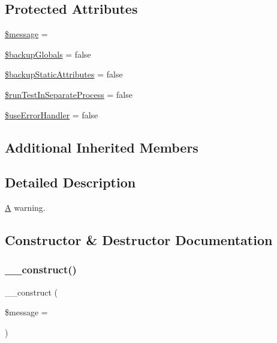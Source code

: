 \subsection*{Protected Attributes}
\begin{DoxyCompactItemize}
\item 
\mbox{\hyperlink{class_p_h_p_unit___framework___warning_test_case_abf17cb2dba2ed17cb28aa5f37deb5293}{\$message}} = \textquotesingle{}\textquotesingle{}
\item 
\mbox{\hyperlink{class_p_h_p_unit___framework___warning_test_case_a7c6af4e36636a61ec139a77a1c07cffe}{\$backup\+Globals}} = false
\item 
\mbox{\hyperlink{class_p_h_p_unit___framework___warning_test_case_a563497416305ba3d1caeb0dbe4454bb3}{\$backup\+Static\+Attributes}} = false
\item 
\mbox{\hyperlink{class_p_h_p_unit___framework___warning_test_case_a7e113cd6fbfe94d18fe43cf7bbd0f899}{\$run\+Test\+In\+Separate\+Process}} = false
\item 
\mbox{\hyperlink{class_p_h_p_unit___framework___warning_test_case_a68c36deb5af7e39a2c8af018224eaa4d}{\$use\+Error\+Handler}} = false
\end{DoxyCompactItemize}
\subsection*{Additional Inherited Members}


\subsection{Detailed Description}
\mbox{\hyperlink{class_a}{A}} warning. 

\subsection{Constructor \& Destructor Documentation}
\mbox{\label{class_p_h_p_unit___framework___warning_test_case_a8300e53307a88a2940196a76ff6c7bfb}} 
\subsubsection{\texorpdfstring{\+\_\+\+\_\+construct()}{\_\_construct()}}
{\footnotesize\ttfamily \+\_\+\+\_\+construct (\begin{DoxyParamCaption}\item[{}]{\$message = {\ttfamily \textquotesingle{}\textquotesingle{}} }\end{DoxyParamCaption})}


